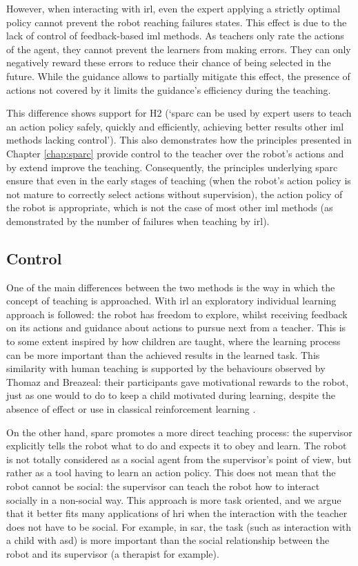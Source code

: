 However, when interacting with \gls{irl}, even the expert applying a strictly optimal policy cannot prevent the robot reaching failures states. This effect is due to the lack of control of feedback-based \gls{iml} methods. As teachers only rate the actions of the agent, they cannot prevent the learners from making errors. They can only negatively reward these errors to reduce their chance of being selected in the future. While the guidance allows to partially mitigate this effect, the presence of actions not covered by it limits the guidance's efficiency during the teaching.

This difference shows support for H2 (`\gls{sparc} can be used by expert users to teach an action policy safely, quickly and efficiently, achieving better results other \gls{iml} methods lacking control'). This also demonstrates how the principles presented in Chapter \ref{chap:sparc} provide control to the teacher over the robot's actions and by extend improve the teaching. Consequently, the principles underlying \gls{sparc} ensure that even in the early stages of teaching (when the robot's action policy is not mature to correctly select actions without supervision), the action policy of the robot is appropriate, which is not the case of most other \gls{iml} methods (as demonstrated by the number of failures when teaching by \gls{irl}).

\subsection{Control}
\label{ssec:control_control}

One of the main differences between the two methods is the way in which the concept of teaching is approached. With \gls{irl} an exploratory individual learning approach is followed: the robot has freedom to explore, whilst receiving feedback on its actions and guidance about actions to pursue next from a teacher. This is to some extent inspired by how children are taught, where the learning process can be more important than the achieved results in the learned task. This similarity with human teaching is supported by the behaviours observed by Thomaz and Breazeal: their participants gave motivational rewards to the robot, just as one would to do to keep a child motivated during learning, despite the absence of effect or use in classical reinforcement learning \citep{thomaz2008teachable}.

On the other hand, \gls{sparc} promotes a more direct teaching process: the supervisor explicitly tells the robot what to do and expects it to obey and learn. The robot is not totally considered as a social agent from the supervisor's point of view, but rather as a tool having to learn an action policy. This does not mean that the robot cannot be social: the supervisor can teach the robot how to interact socially in a non-social way. This approach is more task oriented, and we argue that it better fits many applications of \gls{hri} when the interaction with the teacher does not have to be social. For example, in \gls{sar}, the task (such as interaction with a child with \gls{asd}) is more important than the social relationship between the robot and its supervisor (a therapist for example).

